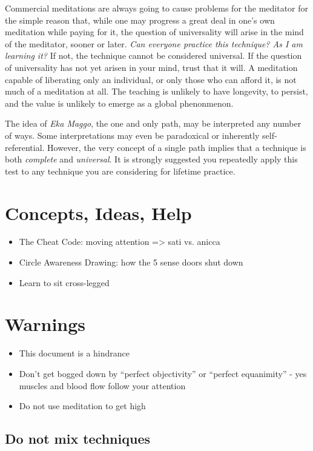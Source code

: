 \documentclass[a4paper, amsfonts, amssymb, amsmath, reprint, showkeys, nofootinbib, twoside]{revtex4-1}
\begin{document}
Commercial meditations are always going to cause problems for the meditator for the
simple reason that, while one may progress a great deal in one's own meditation while
paying for it, the question of universality will arise in the mind of the meditator,
sooner or later. \textit{Can everyone practice this technique? As I am learning it?}
If not, the technique cannot be considered universal. If the question of universality
has not yet arisen in your mind, trust that it will. A meditation capable of
liberating only an individual, or only those who can afford it, is not much of a
meditation at all. The teaching is unlikely to have longevity, to persist, and the
value is unlikely to emerge as a global phenonmenon.

The idea of \textit{Eka Maggo}, the one and only path, may be interpreted any number
of ways. Some interpretations may even be paradoxical or inherently
self-referential. However, the very concept of a single path implies that a technique
is both \textit{complete} and \textit{universal}. It is strongly suggested you
repeatedly apply this test to any technique you are considering for lifetime
practice.

\section{Concepts, Ideas, Help}

\begin{itemize}
  \item The Cheat Code: moving attention => sati vs. anicca
  \item Circle Awareness Drawing: how the 5 sense doors shut down
  \item Learn to sit cross-legged
\end{itemize}


\section{Warnings}

\begin{itemize}
  \item This document is a hindrance
  \item Don't get bogged down by ``perfect objectivity'' or ``perfect equanimity'' - yes muscles and blood flow follow your attention
  \item Do not use meditation to get high
\end{itemize}

\subsection{Do not mix techniques}
\end{document}
